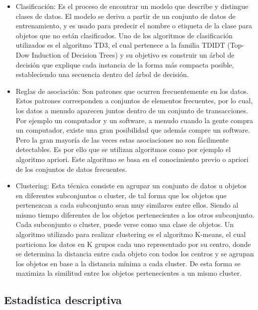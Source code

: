 \begin{itemize}
	\item Clasificación: Es el proceso de encontrar un modelo que describe y distingue clases de datos. El modelo se deriva a partir de un conjunto de datos de entrenamiento, y es usado para predecir el nombre o etiqueta de la clase para objetos que no están clasificados.
	Uno de los algoritmos de clasificación utilizados es el algoritmo TD3, el cual pertenece a la familia TDIDT (Top-Dow Induction of Decision Trees) y su objetivo es construir un árbol de decisión que explique cada instancia de la forma más compacta posible, estableciendo una secuencia dentro del árbol de decisión.\\
	
	\item Reglas de asociación: Son patrones que ocurren frecuentemente en los datos. Estos patrones corresponden a conjuntos de elementos frecuentes, por lo cual, los datos a menudo aparecen juntos dentro de un conjunto de transacciones. Por ejemplo un computador y un software, a menudo cuando la gente compra un computador, existe una gran posibilidad que además compre un software. Pero la gran mayoría de las veces estas asociaciones no son fácilmente detectables. Es por ello que se utilizan algoritmos como por ejemplo el algoritmo apriori. Este algoritmo se basa en el conocimiento previo o apriori de los conjuntos de datos frecuentes.\\
	
	\item Clustering: Esta técnica consiste en agrupar un conjunto de datos u objetos en diferentes subconjuntos o cluster, de tal forma que los objetos que pertenezcan a cada subconjunto sean muy similares entre ellos. Siendo al mismo tiempo diferentes de los objetos pertenecientes a los otros subconjunto. Cada subconjunto o cluster, puede verse como una clase de objetos. Un algoritmo utilizado para realizar clustering es el algoritmo K-means, el cual particiona los datos en K grupos cada uno representado por su centro, donde se determina la distancia entre cada objeto con todos los centros y se agrupan los objetos en base a la distancia mínima a cada cluster. De esta forma se maximiza  la similitud entre los objetos pertenecientes a un mismo cluster.
\end{itemize}



\subsection{Estadística descriptiva}

